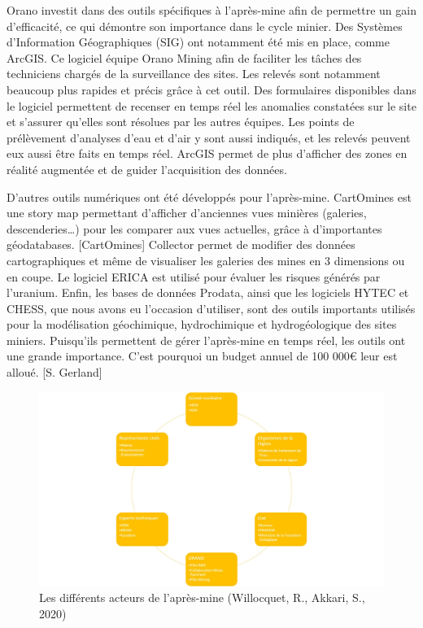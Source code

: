 \documentclass{article}
\begin{document}
Orano investit dans des outils spécifiques à l’après-mine afin de permettre un gain d’efficacité, ce qui démontre son importance dans le cycle minier. Des Systèmes d’Information Géographiques (SIG) ont notamment été mis en place, comme ArcGIS. Ce logiciel équipe Orano Mining afin de faciliter les tâches des techniciens chargés de la surveillance des sites. Les relevés sont notamment beaucoup plus rapides et précis grâce à cet outil. Des formulaires disponibles dans le logiciel permettent de recenser en temps réel les anomalies constatées sur le site et s’assurer qu’elles sont résolues par les autres équipes. Les points de prélèvement d’analyses d’eau et d’air y sont aussi indiqués, et les relevés peuvent eux aussi être faits en temps réel. ArcGIS permet de plus d’afficher des zones en réalité augmentée et de guider l’acquisition des données. 

D’autres outils numériques ont été développés pour l’après-mine. CartOmines est une story map permettant d’afficher d’anciennes vues minières (galeries, descenderies…) pour les comparer aux vues actuelles, grâce à d’importantes géodatabases. [CartOmines] Collector permet de modifier des données cartographiques et même de visualiser les galeries des mines en 3 dimensions ou en coupe. Le logiciel ERICA est utilisé pour évaluer les risques générés par l’uranium. Enfin, les bases de données Prodata, ainsi que les logiciels HYTEC et CHESS, que nous avons eu l’occasion d’utiliser, sont des outils importants utilisés pour la modélisation géochimique, hydrochimique et hydrogéologique des sites miniers. Puisqu’ils permettent de gérer l’après-mine en temps réel, les outils ont une grande importance. C’est pourquoi un budget annuel de 100 000€ leur est alloué. [S. Gerland]


\begin{figure}[H]
    \centering
    \includegraphics[width=0.9\linewidth]{I_B_3.jpg}
    \caption{Les différents acteurs de l'après-mine (Willocquet, R., Akkari, S., 2020)}
    \label{fig:acteurs_apres_mine}
\end{figure}
\end{document}
